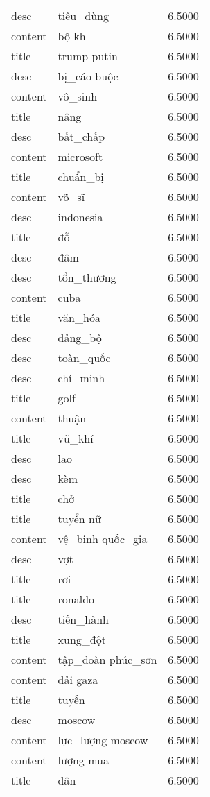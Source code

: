 \documentclass{article}
\begin{document}
\begin{tabular}{lll}
desc & tiêu\_dùng & 6.5000\\
content & bộ kh & 6.5000\\
title & trump putin & 6.5000\\
desc & bị\_cáo buộc & 6.5000\\
content & vô\_sinh & 6.5000\\
title & nâng & 6.5000\\
desc & bất\_chấp & 6.5000\\
content & microsoft & 6.5000\\
title & chuẩn\_bị & 6.5000\\
content & võ\_sĩ & 6.5000\\
desc & indonesia & 6.5000\\
title & đỗ & 6.5000\\
desc & đâm & 6.5000\\
desc & tổn\_thương & 6.5000\\
content & cuba & 6.5000\\
title & văn\_hóa & 6.5000\\
desc & đảng\_bộ & 6.5000\\
desc & toàn\_quốc & 6.5000\\
desc & chí\_minh & 6.5000\\
title & golf & 6.5000\\
content & thuận & 6.5000\\
title & vũ\_khí & 6.5000\\
desc & lao & 6.5000\\
desc & kèm & 6.5000\\
title & chở & 6.5000\\
title & tuyển nữ & 6.5000\\
content & vệ\_binh quốc\_gia & 6.5000\\
desc & vợt & 6.5000\\
title & rơi & 6.5000\\
title & ronaldo & 6.5000\\
desc & tiến\_hành & 6.5000\\
title & xung\_đột & 6.5000\\
content & tập\_đoàn phúc\_sơn & 6.5000\\
content & dải gaza & 6.5000\\
title & tuyến & 6.5000\\
desc & moscow & 6.5000\\
content & lực\_lượng moscow & 6.5000\\
content & lượng mua & 6.5000\\
title & dân & 6.5000\\

\end{tabular}
\end{document}
